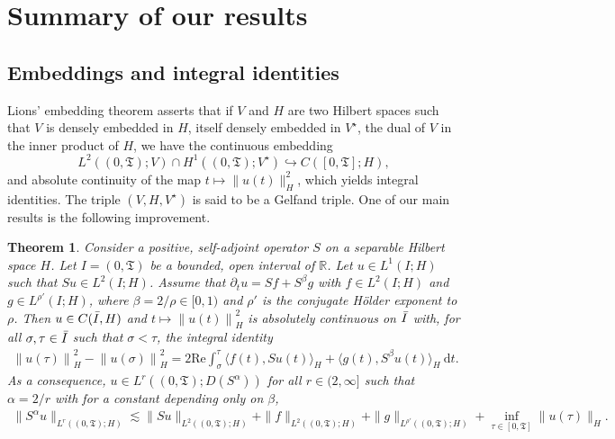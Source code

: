 \documentclass[11pt, letterpaper]{amsart}
\newtheorem{thm}{Theorem}[section]
\theoremstyle{definition}
\theoremstyle{remark}
\numberwithin{equation}{section}
\begin{document}
\section{Summary of our results}\label{sec:summary}



\subsection{Embeddings and integral identities}
 
Lions' embedding theorem \cite{lions1957problemes} asserts that  if $V$ and $H$ are two Hilbert spaces such that $V$ is  densely embedded in $H$, itself densely embedded in  $V^\star$, the dual of $V$ in the inner product of  $H$, we have the continuous embedding
$$ L^2((0, \mathfrak{T}); V) \cap H^1((0, \mathfrak{T}); V^\star) \hookrightarrow C([0, \mathfrak{T}]; H),$$
and absolute continuity of the map $t\mapsto\|u(t)\|_{H}^2$, which yields integral identities. The triple $(V, H, V^\star)$ is said to be a Gelfand triple.
One of our main results is the following improvement.   


\begin{thm}\label{thm:energyboundedinterval} Consider a positive, self-adjoint operator $S$ on a separable Hilbert space $H$.
    Let $I=(0,\mathfrak{T})$ be a  bounded, open interval of $\mathbb{R}$. Let $u \in L^1(I;H)$ such that $Su\in L^2(I;H)$. Assume that $\partial_t u =  Sf+S^\beta g$ with $f \in L^2(I;H)$ and 
     $g \in L^{\rho'}(I;H)$, where ${\beta}={2}/{\rho} \in [0,1)$ and $\rho'$ is the conjugate H\"older exponent to $\rho$. Then $ u \in C(\Bar{I},H)$
and $ t \mapsto \left \| u(t) \right \|^2_H$ is absolutely continuous on $\Bar{I}$ with, for all $ \sigma, \tau \in \Bar{I}$ such that $  \sigma < \tau$, the integral identity
    \begin{align}\label{eq:integralidentityintro}
        \left \| u(\tau) \right \|^2_H-\left \| u(\sigma) \right \|^2_H = 2\mathrm{Re}\int_{\sigma}^{\tau} \langle f(t),Su(t)\rangle_{H} + \langle g(t),S^\beta u(t)\rangle_{H} \  \mathrm d t.
    \end{align}
As a consequence,     $u\in L^r((0,\mathfrak{T});D(S^\alpha))$ for all $r\in (2,\infty]$ such that $\alpha=2/r$ with for a constant depending only on $\beta$, 
\begin{align}\label{eq:Lr}
 \| S^\alpha u \|_{L^r((0,\mathfrak{T});H)} \lesssim  \|Su \|_{L^2((0,\mathfrak{T});H)}+ \|f \|_{L^2((0,\mathfrak{T});H)}+\|g \|_{L^{\rho'}((0,\mathfrak{T});H)} + \inf_{\tau \in [0,\mathfrak{T}]}\|u(\mathfrak{\tau})\|_{H}.
\end{align}
      \end{thm}
\end{document}
